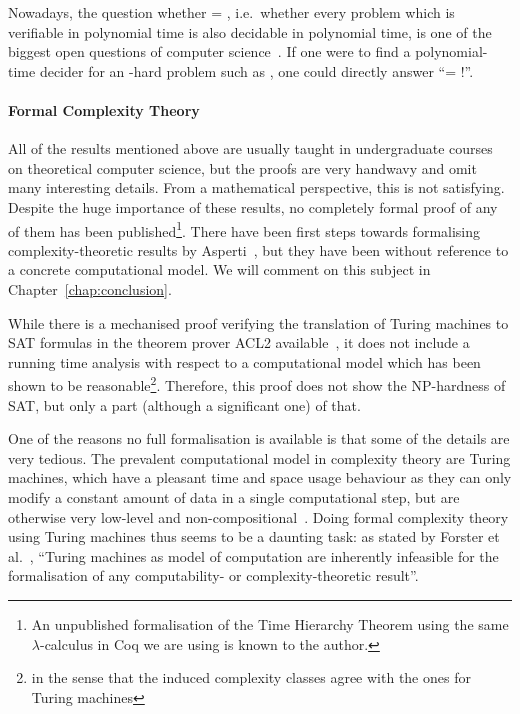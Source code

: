 Nowadays, the question whether \PC{} = \NP{}, i.e.\ whether every problem which is verifiable in polynomial time is also decidable in polynomial time, is one of the biggest open questions of computer science~\cite{claymath}. 
If one were to find a polynomial-time decider for an \NP{}-hard problem such as \SAT{}, one could directly answer ``\PC{}= \NP{}!''.

\paragraph{Formal Complexity Theory}
All of the results mentioned above are usually taught in undergraduate courses on theoretical computer science, but the proofs are very handwavy and omit many interesting details. From a mathematical perspective, this is not satisfying.
Despite the huge importance of these results, no completely formal proof of any of them has been published\footnote{An unpublished formalisation of the Time Hierarchy Theorem using the same $\lambda$-calculus in Coq we are using is known to the author.}. 
There have been first steps towards formalising complexity-theoretic results by Asperti~\cite{asperti:reverse_complexity, asperti:borodin}, but they have been without reference to a concrete computational model. We will comment on this subject in Chapter~\ref{chap:conclusion}.

While there is a mechanised proof verifying the translation of Turing machines to SAT formulas in the theorem prover ACL2 available~\cite{gamboa:cook}, it does not include a running time analysis with respect to a computational model which has been shown to be reasonable\footnote{in the sense that the induced complexity classes agree with the ones for Turing machines}. Therefore, this proof does not show the NP-hardness of SAT, but only a part (although a significant one) of that.

One of the reasons no full formalisation is available is that some of the details are very tedious. The prevalent computational model in complexity theory are Turing machines, which have a pleasant time and space usage behaviour as they can only modify a constant amount of data in a single computational step, but are otherwise very low-level and non-compositional~\cite{ForsterEtAl:2019:VerifiedTMs}.
Doing formal complexity theory using Turing machines thus seems to be a daunting task: as stated by Forster et al.~\cite{ForsterEtAl:2019:VerifiedTMs}, ``Turing machines as model of computation are inherently infeasible for the formalisation of any computability- or complexity-theoretic result''. 

